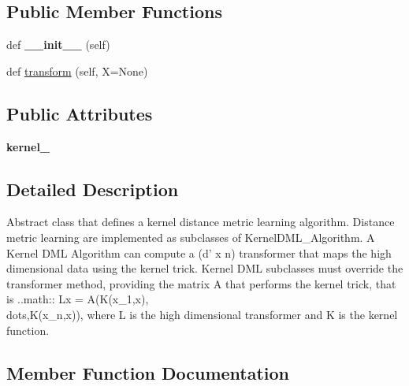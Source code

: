 \subsection*{Public Member Functions}
\begin{DoxyCompactItemize}
\item 
def {\bfseries \+\_\+\+\_\+init\+\_\+\+\_\+} (self)\hypertarget{classdml_1_1dml__algorithm_1_1KernelDML__Algorithm_ac18f6c2e3cde917c89349b719461dc68}{}\label{classdml_1_1dml__algorithm_1_1KernelDML__Algorithm_ac18f6c2e3cde917c89349b719461dc68}

\item 
def \hyperlink{classdml_1_1dml__algorithm_1_1KernelDML__Algorithm_af2875484bd1522bf0db61d6507ee67a2}{transform} (self, X=None)
\end{DoxyCompactItemize}
\subsection*{Public Attributes}
\begin{DoxyCompactItemize}
\item 
{\bfseries kernel\+\_\+}\hypertarget{classdml_1_1dml__algorithm_1_1KernelDML__Algorithm_a28fbb59e6b3a75ee25f06dc432700124}{}\label{classdml_1_1dml__algorithm_1_1KernelDML__Algorithm_a28fbb59e6b3a75ee25f06dc432700124}

\end{DoxyCompactItemize}


\subsection{Detailed Description}
\begin{DoxyVerb}    Abstract class that defines a kernel distance metric learning algorithm.
    Distance metric learning are implemented as subclasses of KernelDML_Algorithm.
    A Kernel DML Algorithm can compute a (d' x n) transformer that maps the high dimensional data using the kernel trick.
    Kernel DML subclasses must override the transformer method, providing the matrix A that performs the kernel trick, that is
    ..math:: Lx = A(K(x_1,x),\\dots,K(x_n,x)),
    where L is the high dimensional transformer and K is the kernel function.
\end{DoxyVerb}
 

\subsection{Member Function Documentation}
